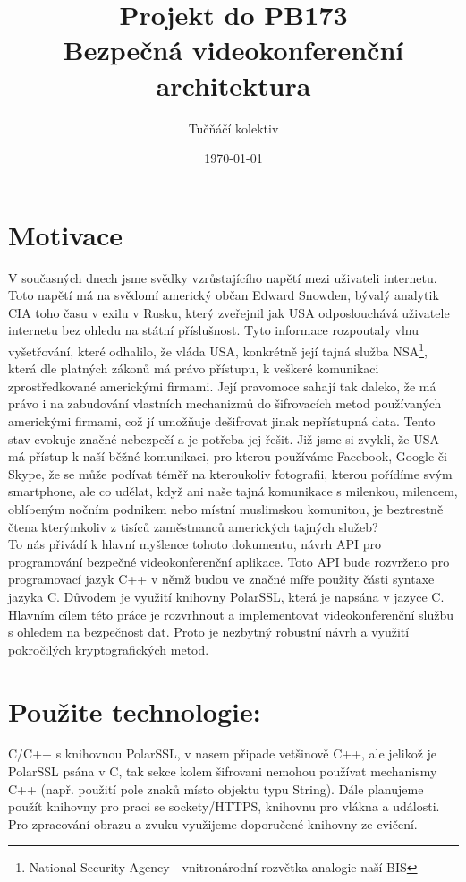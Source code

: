 \documentclass[a4paper, 12pt, titlepage]{article}
\title{Projekt do PB173 \\ Bezpečná videokonferenční architektura}
\author{Tučňáčí kolektiv}
\date{\today}
\begin{document}
\maketitle
\newpage
\tableofcontents
\newpage

\section{Motivace}
V současných dnech jsme svědky vzrůstajícího napětí mezi uživateli internetu. Toto
napětí má na svědomí americký občan Edward Snowden, bývalý analytik CIA toho času
v exilu v Rusku, který zveřejnil jak USA odposlouchává uživatele internetu bez ohledu
na státní příslušnost. Tyto informace rozpoutaly vlnu vyšetřování, které odhalilo,
že vláda USA, konkrétně její tajná služba NSA\footnote{National Security Agency - 
vnitronárodní rozvětka analogie naší BIS}, která dle platných zákonů má právo přístupu,
k veškeré komunikaci zprostředkované americkými firmami. Její pravomoce sahají tak
daleko, že má právo i na zabudování vlastních mechanizmů do šifrovacích metod 
používaných americkými firmami, což jí umožňuje dešifrovat jinak nepřístupná data.
Tento stav evokuje značné nebezpečí a je potřeba jej řešit. Již jsme si zvykli,
že USA má přístup k naší běžné komunikaci, pro kterou používáme Facebook, Google
či Skype, že se může podívat téměř na kteroukoliv fotografii, kterou pořídíme svým
smartphone, ale co udělat, když ani naše tajná komunikace s milenkou, milencem,
oblíbeným nočním podnikem nebo místní muslimskou komunitou, je beztrestně čtena
kterýmkoliv z tisíců zaměstnanců amerických tajných služeb?
\\
To nás přivádí k hlavní myšlence tohoto dokumentu, návrh API pro programování
bezpečné videokonferenční aplikace. Toto API bude rozvrženo pro programovací jazyk
C++ v němž budou ve značné míře použity části syntaxe jazyka C. Důvodem je využití
knihovny PolarSSL, která je napsána v jazyce C. Hlavním cílem této práce je rozvrhnout
a implementovat videokonferenční službu s ohledem na bezpečnost dat. Proto je nezbytný
robustní návrh a využití pokročilých kryptografických metod.

\section{Použite technologie:}
C/C++ s knihovnou PolarSSL, v nasem připade vetšinově C++, ale jelikož je 
PolarSSL psána v C, tak sekce kolem šifrovani nemohou používat mechanismy C++ 
(např. použití pole znaků místo objektu typu String).
Dále planujeme použít knihovny pro praci se sockety/HTTPS, knihovnu pro vlákna a 
události. Pro zpracování obrazu a zvuku využijeme doporučené knihovny ze 
cvičení.
\end{document}
